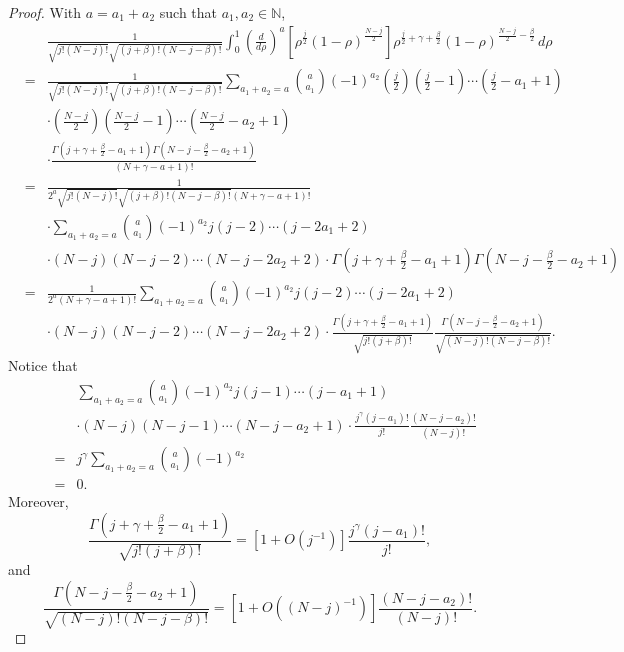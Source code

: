 \documentclass[12pt,reqno]{amsart}
\newcommand\N{\mathbb{N}}
\theoremstyle{plain}
\theoremstyle{remark}
\numberwithin{equation}{section}
\begin{document}
\begin{proof}
With $a=a_1+a_2$ such that $a_1,a_2\in\N$, 
\begin{eqnarray*}
&&\frac{1}{\sqrt{j!(N-j)!}\sqrt{(j+\beta)!(N-j-\beta)!}}\int_0^1\left(\frac{d}{d\rho}\right)^a\left[\rho^\frac j2(1-\rho)^{\frac{N-j}{2}}\right]\rho^{\frac j2+\gamma+\frac\beta2}(1-\rho)^{\frac{N-j}{2}-\frac\beta2}\,d\rho\\
&=&\frac{1}{\sqrt{j!(N-j)!}\sqrt{(j+\beta)!(N-j-\beta)!}}\sum_{a_1+a_2=a}{a\choose a_1}(-1)^{a_2}\left(\frac j2\right)\left(\frac j2-1\right)\cdots\left(\frac j2-a_1+1\right)\\
&&\cdot\left(\frac{N-j}{2}\right)\left(\frac{N-j}{2}-1\right)\cdots\left(\frac{N-j}{2}-a_2+1\right)\\
&&\cdot\frac{\Gamma\left(j+\gamma+\frac\beta2-a_1+1\right)\Gamma\left(N-j-\frac\beta2-a_2+1\right)}{(N+\gamma-a+1)!}\\
&=&\frac{1}{2^a\sqrt{j!(N-j)!}\sqrt{(j+\beta)!(N-j-\beta)!}(N+\gamma-a+1)!}\\
&&\cdot\sum_{a_1+a_2=a}{a\choose a_1}(-1)^{a_2}j(j-2)\cdots\left(j-2a_1+2\right)\\
&&\cdot(N-j)(N-j-2)\cdots\left(N-j-2a_2+2\right)\cdot\Gamma\left(j+\gamma+\frac\beta2-a_1+1\right)\Gamma\left(N-j-\frac\beta2-a_2+1\right)\\
&=&\frac{1}{2^a(N+\gamma-a+1)!}\sum_{a_1+a_2=a}{a\choose a_1}(-1)^{a_2}j(j-2)\cdots\left(j-2a_1+2\right)\\
&&\cdot(N-j)(N-j-2)\cdots\left(N-j-2a_2+2\right)\cdot\frac{\Gamma\left(j+\gamma+\frac\beta2-a_1+1\right)}{\sqrt{j!(j+\beta)!}}\frac{\Gamma\left(N-j-\frac\beta2-a_2+1\right)}{\sqrt{(N-j)!(N-j-\beta)!}}.
\end{eqnarray*}
Notice that 
\begin{eqnarray*}
&&\sum_{a_1+a_2=a}{a\choose a_1}(-1)^{a_2}j(j-1)\cdots\left(j-a_1+1\right)\\
&&\cdot(N-j)(N-j-1)\cdots\left(N-j-a_2+1\right)\cdot\frac{j^\gamma\left(j-a_1\right)!}{j!}\frac{\left(N-j-a_2\right)!}{(N-j)!}\\
&=&j^\gamma\sum_{a_1+a_2=a}{a\choose a_1}(-1)^{a_2}\\
&=&0.
\end{eqnarray*}
Moreover,
$$\frac{\Gamma\left(j+\gamma+\frac\beta2-a_1+1\right)}{\sqrt{j!(j+\beta)!}}=\left[1+O\left(j^{-1}\right)\right]\frac{j^\gamma\left(j-a_1\right)!}{j!},$$
and
$$\frac{\Gamma\left(N-j-\frac\beta2-a_2+1\right)}{\sqrt{(N-j)!(N-j-\beta)!}}=\left[1+O\left((N-j)^{-1}\right)\right]\frac{\left(N-j-a_2\right)!}{(N-j)!}.$$

\end{proof}
\end{document}

